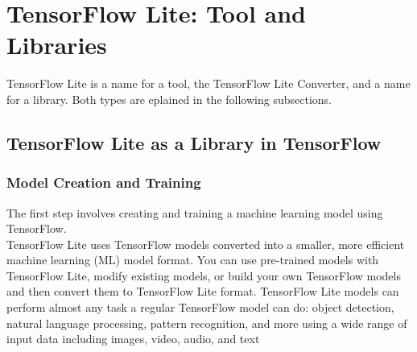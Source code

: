 \begin{center}
  
    
    \label{Software:Flowchart}

\end{center}




\section{TensorFlow Lite: Tool and Libraries}

TensorFlow Lite is a name for a tool, the TensorFlow Lite Converter, and a name for a library.
Both types are eplained in the following subsections.

\subsection{TensorFlow Lite as a Library in TensorFlow}


\subsubsection{Model Creation and Training}
The first step involves creating and training a machine learning model using TensorFlow. 
\\TensorFlow Lite uses TensorFlow models converted into a smaller, more efficient machine learning (ML) model format. You can use pre-trained models with TensorFlow Lite, modify existing models, or build your own TensorFlow models and then convert them to TensorFlow Lite format. TensorFlow Lite models can perform almost any task a regular TensorFlow model can do: object detection, natural language processing, pattern recognition, and more using a wide range of input data including images, video, audio, and text

